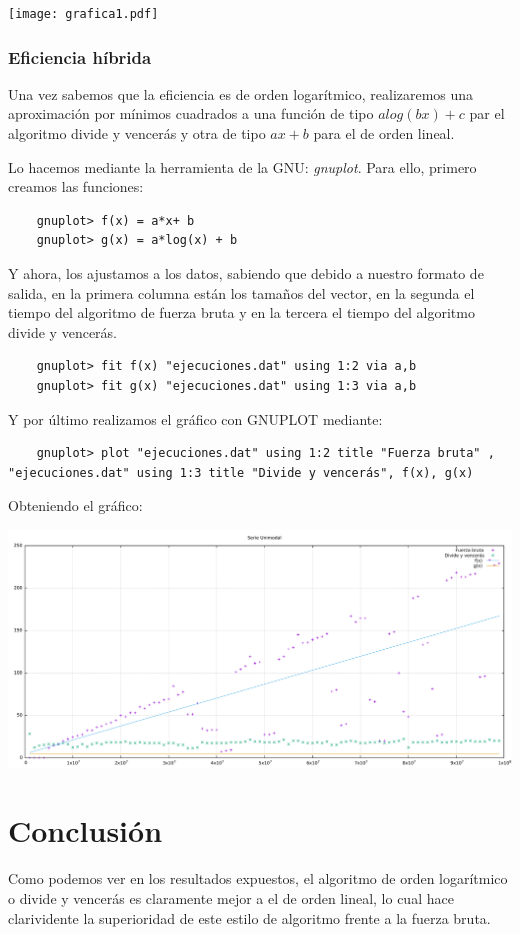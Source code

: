 \documentclass[a4paper, 11pt]{article}
\begin{document}
\begin{center}
	\texttt{[image: grafica1.pdf]}
\end{center}

\subsubsection{Eficiencia híbrida}
Una vez sabemos que la eficiencia es de orden logarítmico, realizaremos una aproximación por mínimos cuadrados a una función de tipo $alog(bx) + c$ par el algoritmo divide y vencerás y otra de tipo $ax + b$ para el de orden lineal.

Lo hacemos mediante la herramienta de la GNU: \emph{gnuplot}.
Para ello, primero creamos las funciones:
\begin{lstlisting}
	gnuplot> f(x) = a*x+ b
	gnuplot> g(x) = a*log(x) + b
\end{lstlisting}

Y ahora, los ajustamos a los datos, sabiendo que debido a nuestro formato de salida, en la primera columna están los tamaños del vector, en la segunda el tiempo del algoritmo de fuerza bruta y en la tercera el tiempo del algoritmo divide y vencerás.

\begin{lstlisting}
	gnuplot> fit f(x) "ejecuciones.dat" using 1:2 via a,b
	gnuplot> fit g(x) "ejecuciones.dat" using 1:3 via a,b
\end{lstlisting}

Y por último realizamos el gráfico con GNUPLOT mediante:
\begin{lstlisting}
	gnuplot> plot "ejecuciones.dat" using 1:2 title "Fuerza bruta" , "ejecuciones.dat" using 1:3 title "Divide y vencerás", f(x), g(x)
\end{lstlisting}

Obteniendo el gráfico:
\begin{center}
	\includegraphics[scale=0.22]{ajuste.pdf}
\end{center}

\section{Conclusión}
Como podemos ver en los resultados expuestos, el algoritmo de orden logarítmico o divide y vencerás es claramente mejor a el de orden lineal, lo cual hace clarividente la superioridad de este estilo de algoritmo frente a la fuerza bruta.
\end{document}
